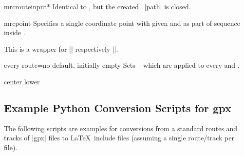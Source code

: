 \begin{docCommand}{mrcrouteinput*}{}
  Identical to , but the created \tikzname\ |path| is
  closed.
\end{docCommand}


\begin{docCommand}{mrcpoint}{}
  Specifies a single coordinate point with given  and
   as part of sequence inside .\par
  This is a wrapper for |\pgfpathmoveto| respectively |\pgfpathlineto|.
\end{docCommand}


\begin{docMrcKey}{every route}{=}{no default, initially empty}
  Sets \tikzname\  which are applied to every
   and .
\end{docMrcKey}


%
\begin{dispExample*}{center lower}
\end{dispExample*}


\clearpage
\subsection{Example Python Conversion Scripts for gpx}\label{sec:routes_gpx}
The following scripts are examples for conversions from a standard
routes and tracks of |gpx| files to \LaTeX\ include files
(assuming a single route/track per file).

